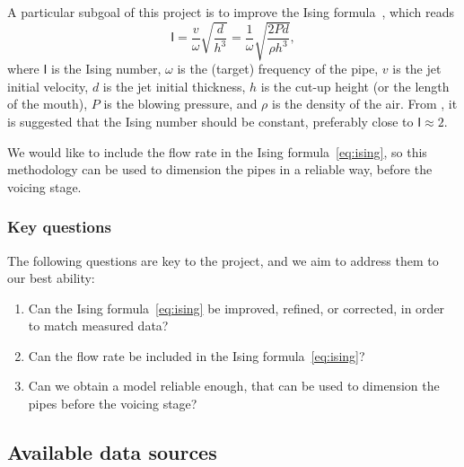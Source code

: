 \documentclass{psu-plan}
\begin{document}
A particular subgoal of this project is to improve the Ising
formula~\autocite{1971Ising-1}, which reads
\begin{equation}
    \label{eq:ising}
    \mathsf{I}
    =
    \frac{v}{\omega}\sqrt{\frac{d}{h^3}}
    =
    \frac{1}{\omega}\sqrt{\frac{2 P d}{\rho h^3}},
\end{equation}
where \(\mathsf{I}\) is the Ising number, \(\omega\) is the (target) frequency
of the pipe, \(v\) is the jet initial velocity, \(d\) is the jet initial
thickness, \(h\) is the cut-up height (or the length of the mouth), \(P\) is the
blowing pressure, and \(\rho\) is the density of the air.
From \autocite{1971Ising-1, 2025Lilj-1}, it is suggested that the Ising number
should be constant, preferably close to \( \mathsf{I} \approx 2\).

We would like to include the flow rate in the Ising formula~\ref{eq:ising}, so
this methodology can be used to dimension the pipes in a reliable way, before
the voicing stage.

\subsubsection{Key questions}

The following questions are key to the project, and we aim to address them to
our best ability:
\begin{enumerate}
    \item Can the Ising formula~\ref{eq:ising} be improved, refined, or
        corrected, in order to match measured data?
    \item Can the flow rate be included in the Ising formula~\ref{eq:ising}?
    \item Can we obtain a model reliable enough, that can be used to dimension the
        pipes before the voicing stage?
\end{enumerate}

\subsection{Available data sources}
\end{document}
